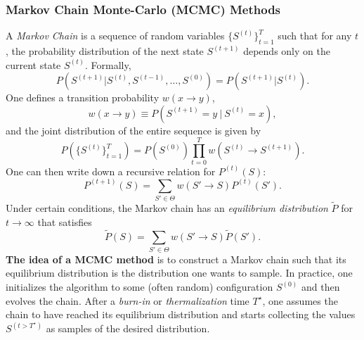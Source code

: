 \documentclass{article}
\begin{document}
\subsubsection*{Markov Chain Monte-Carlo (MCMC) Methods}
A \emph{Markov Chain} is a sequence of random variables $\{S^{(t)}\}_{t=1}^T$ such that for any $t$, the probability distribution of the next state $S^{(t+1)}$ depends only on the current state $S^{(t)}$. Formally,
\begin{equation}
    P(S^{(t+1)} | S^{(t)}, S^{(t-1)}, \dots,S^{(0)})
    =
    P(S^{(t+1)} | S^{(t)}).
\end{equation}
One defines a transition probability $w(x\rightarrow y)$,
\begin{equation}
    w(x\rightarrow y) \equiv P(S^{(t+1)} =y\ |\ S^{(t)}=x),
\end{equation}
and the joint distribution of the entire sequence is given by
\begin{equation}
    P\left(\{S^{(t)}\}_{t=1}^T\right)
    =
    P(S^{(0)}) \prod_{t=0}^{T}
    w(S^{(t)}\rightarrow S^{(t+1)}).
\end{equation}
One can then write down a recursive relation for $P^{(t)}(S)$:
\begin{equation}
    P^{(t+1)}(S)
    =
    \sum_{S' \in \Theta} w(S'\rightarrow S) P^{(t)}(S').
\end{equation}
Under certain conditions, the Markov chain has an \emph{equilibrium distribution} $\tilde{P}$ for $t\rightarrow\infty$ that satisfies
\begin{equation}
    \tilde{P}(S)
    =
    \sum_{S' \in \Theta} w(S'\rightarrow S) \tilde{P}(S').
\end{equation}
\textbf{The idea of a MCMC method} is to construct a Markov chain such that its equilibrium distribution is the distribution one wants to sample. In practice, one initializes the algorithm to some (often random) configuration $S^{(0)}$ and then evolves the chain. After a \emph{burn-in} or \emph{thermalization} time $T^{\star}$, one assumes the chain to have reached its equilibrium distribution and starts collecting the values $S^{(t>T^{\star})}$ as samples of the desired distribution.
\end{document}
